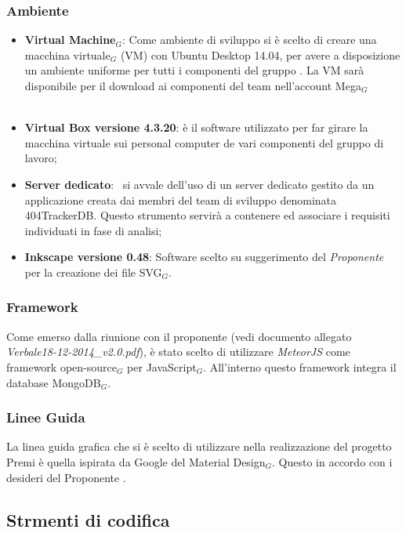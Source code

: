 \subsubsection{Ambiente}
\begin{itemize}
	\item \textbf{Virtual Machine$_G$}:
	\smallbreak
	Come ambiente di sviluppo si è scelto di creare una macchina virtuale$_G$ (VM) con Ubuntu Desktop 14.04, per avere a disposizione un ambiente uniforme per tutti i componenti del gruppo \gruppo. La VM sarà disponibile per il download ai componenti del team nell'account Mega$_G$
	\\ \\
	\item \textbf{Virtual Box versione 4.3.20}: è il software utilizzato per far girare la macchina virtuale sui personal computer de vari componenti del gruppo di lavoro;
	\item \textbf{Server dedicato}:
	\gruppo\ si avvale dell'uso di un server dedicato gestito da un applicazione creata dai membri del team di sviluppo denominata 404TrackerDB. Questo strumento servirà a contenere ed associare i requisiti individuati in fase di analisi;
    \item \textbf{Inkscape versione 0.48}: Software scelto su suggerimento del \textit{Proponente} per la creazione dei file SVG$_G$.
\end{itemize}

\subsubsection{Framework}
Come emerso dalla riunione con il proponente (vedi documento allegato \textit{Verbale18-12-2014\_v2.0.pdf}), è stato scelto di utilizzare \textit{MeteorJS} come framework open-source$_G$ per JavaScript$_G$. All'interno questo framework integra il database MongoDB$_G$.
	
\subsubsection{Linee Guida}
La linea guida grafica che si è scelto di utilizzare nella realizzazione del progetto Premi è quella ispirata da Google del Material Design$_G$. Questo in accordo con i desideri del Proponente \Zucchetti.


\subsection{Strmenti di codifica}
